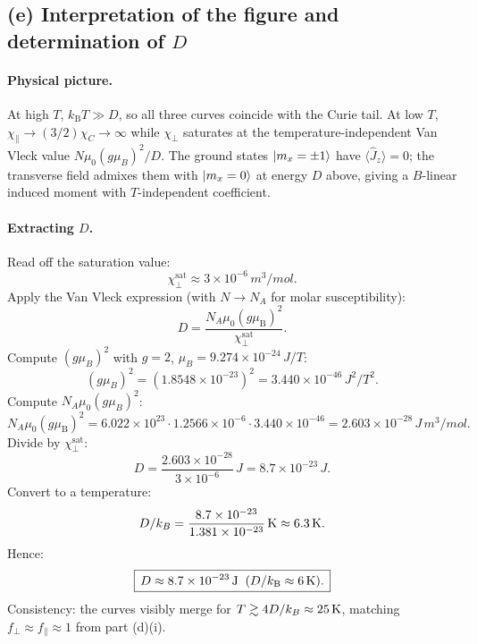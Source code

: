 \documentclass[11pt]{article}
\begin{document}
\subsection*{(e) Interpretation of the figure and determination of $D$}

\paragraph{Physical picture.} At high $T$, $k_{\mathrm B}T\gg D$, so all three curves coincide with the Curie tail. At low $T$, $\chi_\parallel\to(3/2)\chi_C\to\infty$ while $\chi_\perp$ saturates at the temperature-independent Van Vleck value $N\mu_0(g\mu_B)^2/D$. The ground states $\ket{m_x=\pm1}$ have $\langle\hat J_z\rangle=0$; the transverse field admixes them with $\ket{m_x=0}$ at energy $D$ above, giving a $B$-linear induced moment with $T$-independent coefficient.

\paragraph{Extracting $D$.} Read off the saturation value:
\begin{equation}
\chi_{\perp}^{\mathrm{sat}}\approx 3\times 10^{-6}\,\si{m^{3}/mol}.
\end{equation}
Apply the Van Vleck expression (with $N\to N_A$ for molar susceptibility):
\begin{equation}
D=\frac{N_{A}\mu_{0}(g\mu_{\mathrm B})^{2}}{\chi_{\perp}^{\mathrm{sat}}}.
\label{eq:D-extract}
\end{equation}
Compute $(g\mu_B)^2$ with $g=2$, $\mu_B=9.274\times 10^{-24}\,\si{J/T}$:
\begin{equation}
(g\mu_B)^2=(1.8548\times 10^{-23})^2=3.440\times 10^{-46}\,\si{J^2/T^2}.
\end{equation}
Compute $N_A\mu_0(g\mu_B)^2$:
\begin{equation}
N_{A}\mu_{0}(g\mu_{\mathrm B})^{2}=6.022\times 10^{23}\cdot 1.2566\times 10^{-6}\cdot 3.440\times 10^{-46}=2.603\times 10^{-28}\,\si{J\,m^{3}/mol}.
\end{equation}
Divide by $\chi_\perp^{\mathrm{sat}}$:
\begin{equation}
D=\frac{2.603\times 10^{-28}}{3\times 10^{-6}}\,\si{J}=8.7\times 10^{-23}\,\si{J}.
\end{equation}
Convert to a temperature:
\begin{equation}
D/k_B=\frac{8.7\times 10^{-23}}{1.381\times 10^{-23}}\,\si K\approx 6.3\,\si K.
\end{equation}
Hence:
\begin{equation}
\boxed{\,D\approx 8.7\times 10^{-23}\,\si J\;\;(D/k_{\mathrm B}\approx 6\,\si K).\,}
\label{eq:D-final}
\end{equation}
Consistency: the curves visibly merge for $T\gtrsim 4D/k_B\approx 25\,\si K$, matching $f_\perp\approx f_\parallel\approx 1$ from part (d)(i).
\end{document}

